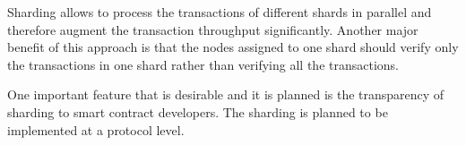 Sharding allows to process the transactions of different shards in parallel
and therefore augment the transaction throughput significantly. Another major
benefit of this approach is that the nodes assigned to one shard should verify
only the transactions in one shard rather than verifying all the transactions.


One important feature that is desirable and it is planned is the transparency
of sharding to smart contract developers. The sharding is planned to be
implemented at a protocol level.



